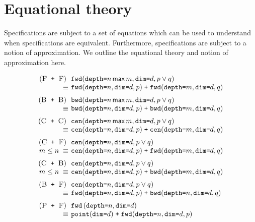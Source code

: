 \documentclass[10pt,preprint]{sigplanconf}
\theoremstyle{definition}
\newcommand{\term}[1]{\texttt{#1}}
\newcommand{\stenFwdS}[2]{\term{fwd} \, (\term{depth=}#1,
  \term{dim=}#2)}
\newcommand{\stenFwdSR}[3]{\term{fwd} (\term{depth=}#1,
  \term{dim=}#2, #3)}
\newcommand{\stenBwdSR}[3]{\term{bwd} (\term{depth=}#1,
  \term{dim=}#2, #3)}
\newcommand{\stenCenSR}[3]{\term{cen} (\term{depth=}#1,
  \term{dim=}#2, #3)}
\newcommand{\stenReflSR}[1]{\term{point} (\term{dim=}#1)}
\begin{document}
\section{Equational theory}
\label{sec:eqs}

Specifications are subject to a set of equations which can be used to
understand when specifications are equivalent. Furthermore,
specifications are subject to a notion of approximation. We outline
the equational theory and notion of approximation here.

\begin{figure}
\vspace{-0.3em}
\begin{align*}
\setlength{\arraycolsep}{0.05em}
\begin{array}{c}
\begin{array}{rll}
(\textsc{F\, \texttt{+} \,F}) \;\; &
\stenFwdSR{n \, \textsf{max} \, m}{d}{p \vee q} \\
 \equiv \; & \stenFwdSR{n}{d}{p} \; \texttt{+} \; \stenFwdSR{m}{d}{q} \\[0.6em]
%
%
(\textsc{B\, \texttt{+} \,B}) \;\; &
\stenBwdSR{n \, \textsf{max} \, m}{d}{p \vee q} \\
 \equiv \; & \stenBwdSR{n}{d}{p} \; \texttt{+} \; \stenBwdSR{m}{d}{q} \\[0.6em]
%
%
(\textsc{C\, \texttt{+} \,C}) \;\; &
\stenCenSR{n \, \textsf{max} \, m}{d}{p \vee q} \\
\equiv \; & \stenCenSR{n}{d}{p} \; \texttt{+} \; \stenCenSR{m}{d}{q} \\[0.6em]
%
%
(\textsc{C\, \texttt{+} \,F}) \;\; & \stenCenSR{n}{d}{p \vee q} \\
\textit{$m \leq n$} \; \equiv \; & \stenCenSR{n}{d}{p} \; \texttt{+} \;
                      \stenFwdSR{m}{d}{q} \\[0.6em]
%
%
(\textsc{C\, \texttt{+} \,B}) \;\; &
\stenCenSR{n}{d}{p \vee q} \\
\textit{$m \leq n$} \; \equiv \; & \stenCenSR{n}{d}{p} \; \texttt{+} \;
                      \stenBwdSR{m}{d}{q} \\[0.6em]
%
%
(\textsc{B\, \texttt{+} \,F}) \;\; &
\stenCenSR{n}{d}{p \vee q} \\
\equiv \; & \stenFwdSR{n}{d}{p} \; \texttt{+} \; \stenBwdSR{n}{d}{q}
  \\[0.6em]
%
%
(\textsc{P\, \texttt{+} \,F}) \;\; &
\stenFwdS{n}{d} \\
\equiv \; & \stenReflSR{d} \; \texttt{+} \; \stenFwdSR{n}{d}{p} \\[0.6em]

\end{array}
\end{array}
\end{align*}
\end{figure}
\end{document}
